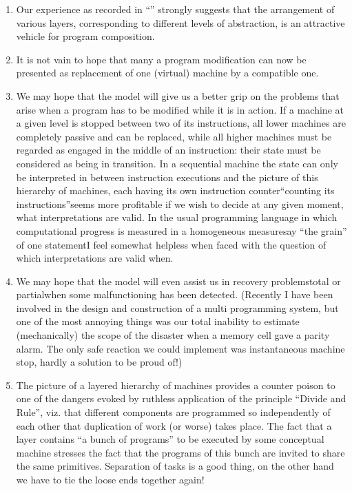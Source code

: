 \begin{enumerate}[wide, nosep, label=(\arabic*)]
	\item Our experience as recorded in ``'' strongly suggests that the arrangement of various layers, corresponding to different levels of abstraction, is an attractive vehicle for program composition.

	\item It is not vain to hope that many a program modification can now be presented as replacement of one (virtual) machine by a compatible one.

	\item We may hope that the model will give us a better grip on the problems that arise when a program has to be modified while it is in action. If a machine at a given level is stopped between two of its instructions, all lower  machines are completely passive and can be replaced, while all higher machines must be regarded as engaged in the middle of an instruction: their state must be considered as being in transition. In a sequential machine the state can only be interpreted in between instruction executions and the picture of this hierarchy of machines, each having its own instruction counter\textemdash{}``counting its instructions''\textemdash{}seems more profitable if we wish to decide at any given moment, what interpretations are valid. In the usual programming language in which computational progress is measured in a homogeneous measure\textemdash{}say ``the grain'' of one statement\textemdash{}I feel somewhat helpless when faced with the question of which interpretations are valid when.
	
	\item We may hope that the model will even assist us in recovery problems\textemdash{}total or partial\textemdash{}when some malfunctioning has been detected. (Recently I have been involved in the design and construction of a multi programming system, but one of the most annoying things was our total inability to estimate (mechanically) the scope of the disaster when a memory cell gave a parity alarm. The only safe reaction we could implement was instantaneous machine stop, hardly a solution to be proud of!)
	
	\item The picture of a layered hierarchy of machines provides a counter 	poison to one of the dangers evoked by ruthless application of the principle ``Divide and Rule'', viz. that different components are programmed so independently of each other that duplication of work (or worse) takes place. The fact that a layer contains ``a bunch of programs'' to be executed by some conceptual machine stresses the fact that the programs of this bunch are invited to share the same primitives. Separation of tasks is a good thing, on the other hand we have to tie the loose ends together again!
\end{enumerate}

